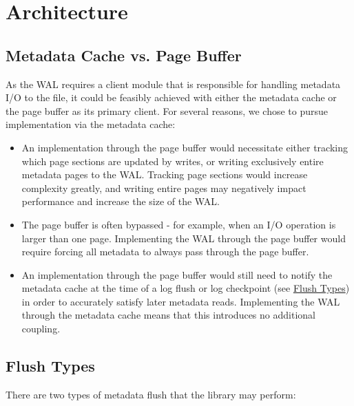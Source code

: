 \section{Architecture}
\label{sec:architecture}

\subsection{Metadata Cache vs. Page Buffer}

As the WAL requires a client module that is responsible for handling metadata I/O to the file, it could be feasibly achieved with either the metadata cache or the page buffer as its primary client. For several reasons, we chose to pursue implementation via the metadata cache:

\begin{itemize}
    \item An implementation through the page buffer would necessitate either tracking which page sections are updated by writes, or writing exclusively entire metadata pages to the WAL. Tracking page sections would increase complexity greatly, and writing entire pages may negatively impact performance and increase the size of the WAL.
    
    \item The page buffer is often bypassed - for example, when an I/O operation is larger than one page. Implementing the WAL through the page buffer would require forcing all metadata to always pass through the page buffer.
    
    \item An implementation through the page buffer would still need to notify the metadata cache at the time of a log flush or log checkpoint (see \hyperref[sec:Flush-Types]{Flush Types}) in order to accurately satisfy later metadata reads. Implementing the WAL through the metadata cache means that this introduces no additional coupling.

\end{itemize}

\subsection{Flush Types}
\label{sec:Flush-Types}

There are two types of metadata flush that the library may perform:

